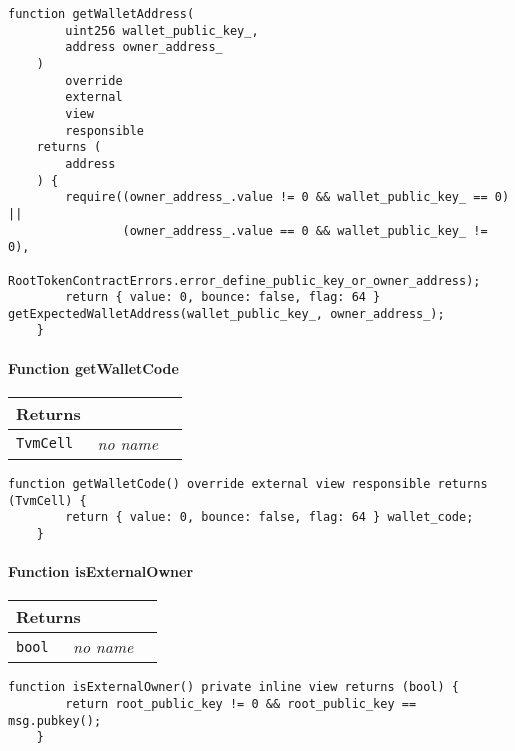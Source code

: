 \vspace{2cm}

\begin{lstlisting}[firstnumber=111]
    function getWalletAddress(
        uint256 wallet_public_key_,
        address owner_address_
    )
        override
        external
        view
        responsible
    returns (
        address
    ) {
        require((owner_address_.value != 0 && wallet_public_key_ == 0) ||
                (owner_address_.value == 0 && wallet_public_key_ != 0),
                RootTokenContractErrors.error_define_public_key_or_owner_address);
        return { value: 0, bounce: false, flag: 64 } getExpectedWalletAddress(wallet_public_key_, owner_address_);
    }
\end{lstlisting}

\paragraph{Function getWalletCode}


\ifsoltables
\noindent\begin{tabular}{|l|l|p{5cm}|}\hline
\multicolumn{3}{|l|}{\bf Returns}\\\hline
\tt TvmCell & {\em no name} &\\\hline
\end{tabular}
\fi

\vspace{2cm}

\begin{lstlisting}[firstnumber=100]
    function getWalletCode() override external view responsible returns (TvmCell) {
        return { value: 0, bounce: false, flag: 64 } wallet_code;
    }
\end{lstlisting}

\paragraph{Function isExternalOwner}


\ifsoltables
\noindent\begin{tabular}{|l|l|p{5cm}|}\hline
\multicolumn{3}{|l|}{\bf Returns}\\\hline
\tt bool & {\em no name} &\\\hline
\end{tabular}
\fi

\vspace{2cm}

\begin{lstlisting}[firstnumber=476]
    function isExternalOwner() private inline view returns (bool) {
        return root_public_key != 0 && root_public_key == msg.pubkey();
    }
\end{lstlisting}

